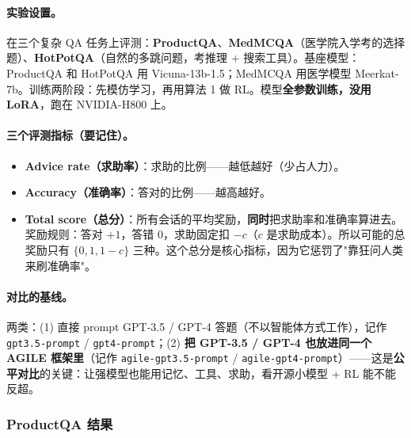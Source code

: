 \documentclass[11pt,UTF8,fontset=fandol]{ctexart}
\begin{document}
\paragraph{实验设置。} 在三个复杂 QA 任务上评测：\textbf{ProductQA}、\textbf{MedMCQA}（医学院入学考的选择题）、\textbf{HotPotQA}（自然的多跳问题，考推理 + 搜索工具）。基座模型：ProductQA 和 HotPotQA 用 Vicuna-13b-1.5；MedMCQA 用医学模型 Meerkat-7b。训练两阶段：先模仿学习，再用算法 1 做 RL。模型\textbf{全参数训练，没用 LoRA}，跑在 NVIDIA-H800 上。

\paragraph{三个评测指标（要记住）。}
\begin{itemize}[leftmargin=1.5em]
\item \textbf{Advice rate（求助率）}：求助的比例——越低越好（少占人力）。
\item \textbf{Accuracy（准确率）}：答对的比例——越高越好。
\item \textbf{Total score（总分）}：所有会话的平均奖励，\textbf{同时}把求助率和准确率算进去。奖励规则：答对 $+1$，答错 $0$，求助固定扣 $-c$（$c$ 是求助成本）。所以可能的总奖励只有 $\{0, 1, 1-c\}$ 三种。这个总分是核心指标，因为它惩罚了"靠狂问人类来刷准确率"。
\end{itemize}

\paragraph{对比的基线。} 两类：(1) 直接 prompt GPT-3.5 / GPT-4 答题（不以智能体方式工作），记作 \texttt{gpt3.5-prompt} / \texttt{gpt4-prompt}；(2) \textbf{把 GPT-3.5 / GPT-4 也放进同一个 AGILE 框架里}（记作 \texttt{agile-gpt3.5-prompt} / \texttt{agile-gpt4-prompt}）——这是\textbf{公平对比}的关键：让强模型也能用记忆、工具、求助，看开源小模型 + RL 能不能反超。

\subsubsection{ProductQA 结果}
\end{document}
